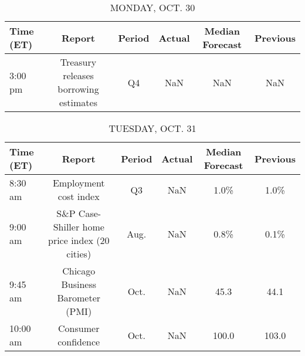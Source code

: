 \documentclass{article}%
\begin{document}
%
\normalsize%


\begin{table}[htbp]%
\caption{MONDAY, OCT. 30}%
\centering%
\begin{adjustbox}{width=1\textwidth}%
\begin{tabular}{lccccc}
\toprule
Time (ET) &                                Report & Period & Actual & Median Forecast & Previous \\
\midrule
  3:00 pm & Treasury releases borrowing estimates &     Q4 &    NaN &             NaN &      NaN \\
\bottomrule
\end{tabular}
%
\end{adjustbox}%
\end{table}

%


\begin{table}[htbp]%
\caption{TUESDAY, OCT. 31}%
\centering%
\begin{adjustbox}{width=1\textwidth}%
\begin{tabular}{lccccc}
\toprule
Time (ET) &                                        Report & Period & Actual & Median Forecast & Previous \\
\midrule
  8:30 am &                         Employment cost index &     Q3 &    NaN &            1.0\% &     1.0\% \\
  9:00 am & S\&P Case-Shiller home price index (20 cities) &   Aug. &    NaN &            0.8\% &     0.1\% \\
  9:45 am &              Chicago Business Barometer (PMI) &   Oct. &    NaN &            45.3 &     44.1 \\
 10:00 am &                           Consumer confidence &   Oct. &    NaN &           100.0 &    103.0 \\
\bottomrule
\end{tabular}
%
\end{adjustbox}%
\end{table}

%
\end{document}
